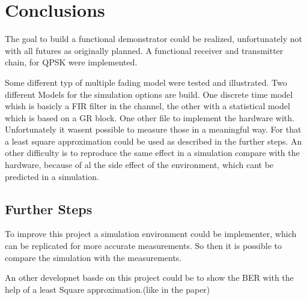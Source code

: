 
\chapter{Conclusions}

The goal to build a functional demonstrator could be realized, unfortunately not with all futures as originally planned. A functional receiver and transmitter chain, for QPSK were implemented.

Some different typ of multiple fading model were tested and illustrated.
Two different Models for the simulation options are build. One discrete time model whish is  basicly a FIR filter in the channel, the other with a statistical model which is based on a GR block.
One other file to implement the hardware with. Unfortunately it wasent possible to measure those in a meaningful way. For that a least square approximation could be used as described in the further steps. An other difficulty is to reproduce the same effect in a simulation compare with the hardware, because of al the side effect of the environment, which cant be predicted in a simulation.



\section{Further Steps}

To improve this project a simulation environment could be implementer, which can be replicated for more accurate measurements. So then it is possible to compare the simulation with the measurements.

An other  developnet basde on this project could be to show the BER with the help of a least Square approximation.(like in the paper)